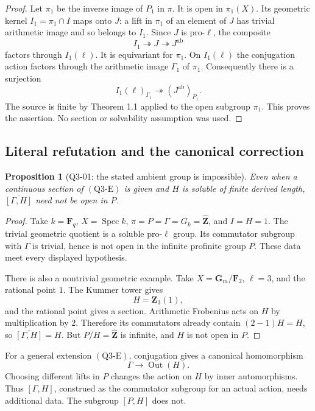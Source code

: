 \documentclass[11pt,a4paper]{article}
\newtheorem{proposition}[theorem]{Proposition}
\theoremstyle{remark}
\begin{document}
\begin{proof}
Let \(\pi_1\) be the inverse image of \(P_1\) in \(\pi\).  It is open
in \(\pi_1(X)\).  Its geometric kernel
\(I_1=\pi_1\cap I\) maps onto \(J\): a lift in \(\pi_1\) of an
element of \(J\) has trivial arithmetic image and so belongs to
\(I_1\).  Since \(J\) is pro-\(\ell\), the composite
\[
I_1\twoheadrightarrow J\twoheadrightarrow J^{\mathrm{ab}}
\]
factors through \(I_1(\ell)\).  It is equivariant for \(\pi_1\).
On \(I_1(\ell)\) the conjugation action factors through the arithmetic
image \(\Gamma_1\) of \(\pi_1\).  Consequently there is a surjection
\[
I_1(\ell)_{\Gamma_1}\twoheadrightarrow
(J^{\mathrm{ab}})_{P_1}.
\]
The source is finite by Theorem 1.1 applied to the open subgroup
\(\pi_1\).  This proves the assertion.  No section or solvability
assumption was used.
\end{proof}

\subsection{Literal refutation and the canonical correction}

\begin{proposition}[Q3-01: the stated ambient group is impossible]
\label{q3:literal}
Even when a continuous section of \((\mathrm{Q3\text{-}E})\) is given
and \(H\) is soluble of finite derived length,
\(\overline{[\Gamma,H]}\) need not be open in \(P\).
\end{proposition}

\begin{proof}
Take \(k=\mathbf F_q\), \(X=\operatorname{Spec}k\),
\(\pi=P=\Gamma=G_k=\widehat{\mathbf Z}\), and \(I=H=1\).
The trivial geometric quotient is a soluble pro-\(\ell\) group.
Its commutator subgroup with \(\Gamma\) is trivial, hence is not
open in the infinite profinite group \(P\).  These data meet every
displayed hypothesis.

There is also a nontrivial geometric example.  Take
\(X=\mathbf G_m/\mathbf F_2\), \(\ell=3\), and the rational point
\(1\).  The Kummer tower gives
\[
H=\mathbf Z_3(1),
\]
and the rational point gives a section.  Arithmetic Frobenius acts
on \(H\) by multiplication by \(2\).  Therefore its commutators
already contain \((2-1)H=H\), so
\(\overline{[\Gamma,H]}=H\).  But
\(P/H=\widehat{\mathbf Z}\) is infinite, and \(H\) is not open in
\(P\).
\end{proof}

For a general extension \((\mathrm{Q3\text{-}E})\), conjugation gives
a canonical homomorphism
\[
\Gamma\longrightarrow\operatorname{Out}(H).
\]
Choosing different lifts in \(P\) changes the action on \(H\) by
inner automorphisms.  Thus \([\Gamma,H]\), construed as the
commutator subgroup for an actual action, needs additional data.
The subgroup \([P,H]\) does not.
\end{document}
